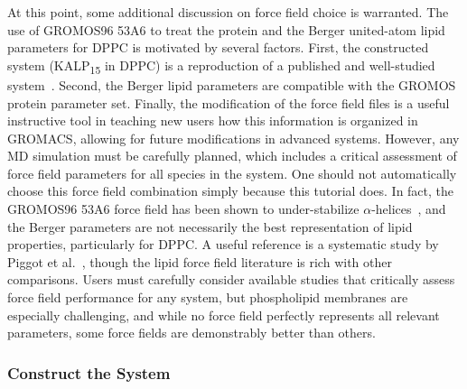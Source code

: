 \documentclass[9pt,tutorial,pubversion]{livecoms}
\begin{document}
At this point, some additional discussion on force field choice is warranted. The use of GROMOS96 53A6 to treat the protein and the Berger united-atom lipid parameters for DPPC is motivated by several factors. First, the constructed system (KALP\textsubscript{15} in DPPC) is a reproduction of a published and well-studied system~\cite{Kandasamy2006}. Second, the Berger lipid parameters are compatible with the GROMOS protein parameter set. Finally, the modification of the force field files is a useful instructive tool in teaching new users how this information is organized in GROMACS, allowing for future modifications in advanced systems. However, any MD simulation must be carefully planned, which includes a critical assessment of force field parameters for all species in the system. One should not automatically choose this force field combination simply because this tutorial does. In fact, the GROMOS96 53A6 force field has been shown to under-stabilize $\alpha$-helices~\cite{Schmid2011}, and the Berger parameters are not necessarily the best representation of lipid properties, particularly for DPPC. A useful reference is a systematic study by Piggot et al.~\cite{Piggot2012}, though the lipid force field literature is rich with other comparisons. Users must carefully consider available studies that critically assess force field performance for any system, but phospholipid membranes are especially challenging, and while no force field perfectly represents all relevant parameters, some force fields are demonstrably better than others.

\subsubsection{Construct the System} \label{kalp_construct}
\end{document}
